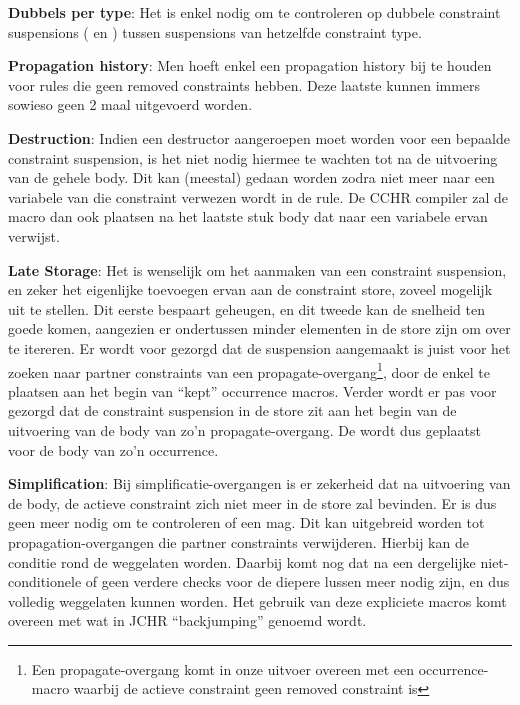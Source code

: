 {\bf Dubbels per type}: Het is enkel nodig om te controleren op dubbele constraint suspensions ( en ) tussen suspensions van hetzelfde constraint type.

{\bf Propagation history}: Men hoeft enkel een propagation history bij te houden voor rules die geen removed constraints hebben. Deze laatste kunnen immers sowieso geen 2 maal uitgevoerd worden.

{\bf Destruction}: Indien een destructor aangeroepen moet worden voor een bepaalde constraint suspension, is het niet nodig hiermee te wachten tot na de uitvoering van de gehele body. Dit kan (meestal) gedaan worden zodra niet meer naar een variabele van die constraint verwezen wordt in de rule. De CCHR compiler zal de  macro dan ook plaatsen na het laatste stuk body dat naar een variabele ervan verwijst.

{\bf Late Storage}: Het is wenselijk om het aanmaken van een constraint suspension, en zeker het eigenlijke toevoegen ervan aan de constraint store, zoveel mogelijk uit te stellen. Dit eerste bespaart geheugen, en dit tweede kan de snelheid ten goede komen, aangezien er ondertussen minder elementen in de store zijn om over te itereren. Er wordt voor gezorgd dat de suspension aangemaakt is juist voor het zoeken naar partner constraints van een propagate-overgang\footnote{Een propagate-overgang komt in onze uitvoer overeen met een occurrence-macro waarbij de actieve constraint geen removed constraint is}, door de  enkel te plaatsen aan het begin van ``kept'' occurrence macros. Verder wordt er pas voor gezorgd dat de constraint suspension in de store zit aan het begin van de uitvoering van de body van zo'n propagate-overgang. De  wordt dus geplaatst voor de body van zo'n occurrence.

{\bf Simplification}: Bij simplificatie-overgangen is er zekerheid dat na uitvoering van de body, de actieve constraint zich niet meer in de store zal bevinden. Er is dus geen  meer nodig om te controleren of een  mag. Dit kan uitgebreid worden tot propagation-overgangen die partner constraints verwijderen. Hierbij kan de  conditie rond de  weggelaten worden. Daarbij komt nog dat na een dergelijke niet-conditionele  of  geen verdere checks voor de diepere lussen meer nodig zijn, en dus volledig weggelaten kunnen worden. Het gebruik van deze expliciete  macros komt overeen met wat in JCHR ``backjumping'' genoemd wordt.

